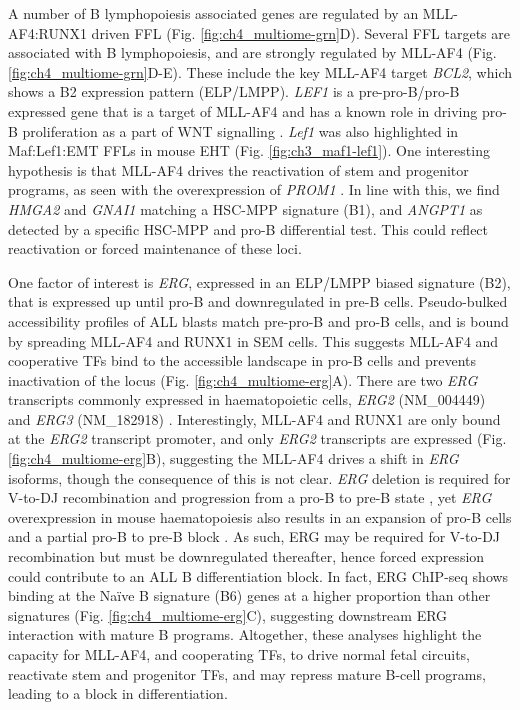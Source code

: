 A number of B lymphopoiesis associated genes are regulated by an MLL-AF4:RUNX1 driven FFL (Fig. \ref{fig:ch4_multiome-grn}D). Several FFL targets are associated with B lymphopoiesis, and are strongly regulated by MLL-AF4 (Fig. \ref{fig:ch4_multiome-grn}D-E). These include the key MLL-AF4 target \textit{BCL2}, which shows a B2 expression pattern (ELP/LMPP). \textit{LEF1} is a pre-pro-B/pro-B expressed gene that is a target of MLL-AF4 \citep{kerry_mll-af4_2017} and has a known role in driving pro-B proliferation as a part of WNT signalling \citep{reya_wnt_2000}. \textit{Lef1} was also highlighted in Maf:Lef1:EMT FFLs in mouse EHT (Fig. \ref{fig:ch3_maf1-lef1}). One interesting hypothesis is that MLL-AF4 drives the reactivation of stem and progenitor programs, as seen with the overexpression of \textit{PROM1} \citep{godfrey_h3k79me23_2021, mak_mixed_2012, obyrne_discovery_2019}. In line with this, we find \textit{HMGA2} and \textit{GNAI1} matching a HSC-MPP signature (B1), and \textit{ANGPT1} as detected by a specific HSC-MPP and pro-B differential test. This could reflect reactivation or forced maintenance of these loci. 

One factor of interest is \textit{ERG}, expressed in an ELP/LMPP biased signature (B2), that is expressed up until pro-B and downregulated in pre-B cells. Pseudo-bulked accessibility profiles of ALL blasts match pre-pro-B and pro-B cells, and is bound by spreading MLL-AF4 and RUNX1 in SEM cells. This suggests MLL-AF4 and cooperative TFs bind to the accessible landscape in pro-B cells and prevents inactivation of the locus (Fig. \ref{fig:ch4_multiome-erg}A). There are two \textit{ERG} transcripts commonly expressed in haematopoietic cells, \textit{ERG2} (NM\_004449) and \textit{ERG3} (NM\_182918) \citep{bohne_epigenetic_2009}. Interestingly, MLL-AF4 and RUNX1 are only bound at the \textit{ERG2} transcript promoter, and only \textit{ERG2} transcripts are expressed (Fig. \ref{fig:ch4_multiome-erg}B), suggesting the MLL-AF4 drives a shift in \textit{ERG} isoforms, though the consequence of this is not clear. \textit{ERG} deletion is required for V-to-DJ recombination and progression from a pro-B to pre-B state \citep{sondergaard_erg_2019}, yet \textit{ERG} overexpression in mouse haematopoiesis also results in an expansion of pro-B cells and a partial pro-B to pre-B block \citep{tsuzuki_promotion_2011}. As such, ERG may be required for V-to-DJ recombination but must be downregulated thereafter, hence forced expression could contribute to an ALL B differentiation block. In fact, ERG ChIP-seq shows binding at the Na\"{i}ve B signature (B6) genes at a higher proportion than other signatures (Fig. \ref{fig:ch4_multiome-erg}C), suggesting downstream ERG interaction with mature B programs. Altogether, these analyses highlight the capacity for MLL-AF4, and cooperating TFs, to drive normal fetal circuits, reactivate stem and progenitor TFs, and may repress mature B-cell programs, leading to a block in differentiation.

